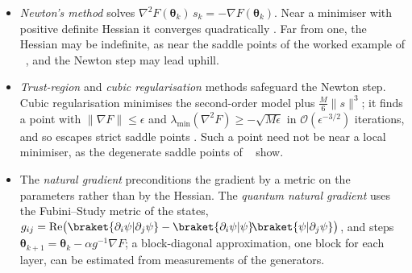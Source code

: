 \documentclass[handoutsbeamer.tex]{subfiles}
\begin{document}
\begin{frame}
\onp{\footnotesize}
\begin{itemize}\setlength\itemsep{0.25em}
    \item \emph{Newton's method} solves $\nabla^2F(\boldsymbol\theta_k)\,s_k = -\nabla F(\boldsymbol\theta_k)$. Near a minimiser with positive definite Hessian it converges quadratically \citep[Chapter~3]{nocedal2006numerical}. Far from one, the Hessian may be indefinite, as near the saddle points of the worked example of \Chap~, and the Newton step may lead uphill.
    \item \emph{Trust-region} and \emph{cubic regularisation} methods safeguard the Newton step. Cubic regularisation minimises the second-order model plus $\frac M6\|s\|^3$; it finds a point with $\|\nabla F\|\le\epsilon$ and $\lambda_{\min}(\nabla^2F)\ge-\sqrt{M\epsilon}$ in $\mathcal O(\epsilon^{-3/2})$ iterations, and so escapes strict saddle points \citep{nesterov2006cubic}. Such a point need not be near a local minimiser, as the degenerate saddle points of \Chap~ show.
    \item The \emph{natural gradient} \citep{amari1998natural} preconditions the gradient by a metric on the parameters rather than by the Hessian. The \emph{quantum natural gradient} \citep{Stokes2020quantumnatural} uses the Fubini--Study metric of the states, $g_{ij} = \mathrm{Re}\big(\braket{\partial_i\psi|\partial_j\psi} - \braket{\partial_i\psi|\psi}\!\braket{\psi|\partial_j\psi}\big)$, and steps $\boldsymbol\theta_{k+1} = \boldsymbol\theta_k - \alpha g^{-1}\nabla F$; a block-diagonal approximation, one block for each layer, can be estimated from measurements of the generators.
\end{itemize}
\end{frame}
\end{document}
